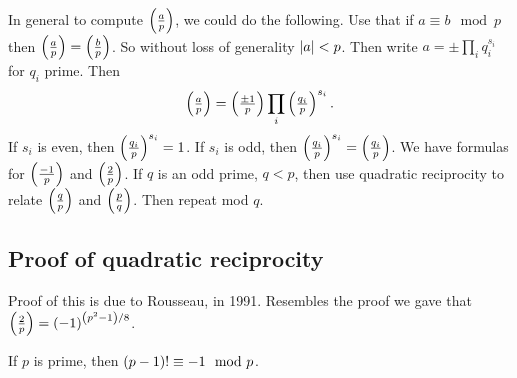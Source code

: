 In general to compute $ \left( \tfrac{a}{p} \right) $, we could do the following. Use that if $ a \equiv b \mod p $ then $ \left( \tfrac{a}{p} \right) = \left( \tfrac{b}{p} \right) $. So without loss of generality $ \left\lvert a \right\rvert < p $. Then write $ a = \pm \prod_i q_i^{s_i} $ for $ q_i $ prime. Then
$$ \left( \tfrac{a}{p} \right) = \left( \tfrac{\pm 1}{p} \right) \prod_i \left( \tfrac{q_i}{p} \right)^{s_i}. $$
If $ s_i $ is even, then $ \left( \tfrac{q_i}{p} \right)^{s_i} = 1 $. If $ s_i $ is odd, then $ \left( \tfrac{q_i}{p} \right)^{s_i} = \left( \tfrac{q_i}{p} \right) $. We have formulas for $ \left( \tfrac{-1}{p} \right) $ and $ \left( \tfrac{2}{p} \right) $. If $ q $ is an odd prime, $ q < p $, then use quadratic reciprocity to relate $ \left( \tfrac{q}{p} \right) $ and $ \left( \tfrac{p}{q} \right) $. Then repeat mod $ q $.


\subsection{Proof of quadratic reciprocity}

Proof of this is due to Rousseau, in 1991. Resembles the proof we gave that $ \left( \tfrac{2}{p} \right) = \left( -1 \right)^{\left( p^2 - 1 \right) / 8} $.

\begin{theorem}
If $ p $ is prime, then $ \left( p - 1 \right)! \equiv -1 \mod p $.
\end{theorem}


